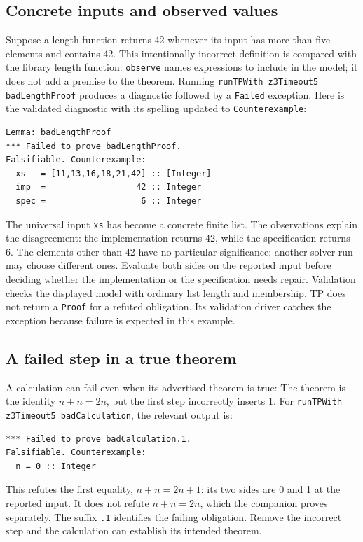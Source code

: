\documentclass[review]{jfp-epi}
\newcommand{\code}[1]{\texttt{#1}}
\begin{document}
\subsection{Concrete inputs and observed values}

Suppose a length function returns 42 whenever its input has more than five
elements and contains 42. This intentionally incorrect definition is compared
with the library length function:
\code{observe} names expressions to include in the model; it does not add a
premise to the theorem. Running \code{runTPWith z3Timeout5 badLengthProof}
produces a diagnostic followed by a \code{Failed} exception. Here is the
validated diagnostic with its spelling updated to \code{Counterexample}:
\begin{lstlisting}[style=output]
Lemma: badLengthProof
*** Failed to prove badLengthProof.
Falsifiable. Counterexample:
  xs   = [11,13,16,18,21,42] :: [Integer]
  imp  =                  42 :: Integer
  spec =                   6 :: Integer
\end{lstlisting}
The universal input \code{xs} has become a concrete finite list. The observations
explain the disagreement: the implementation returns 42, while the specification
returns 6. The elements other than 42 have no particular significance; another
solver run may choose different ones. Evaluate both sides on the reported input
before deciding whether the implementation or the specification needs repair.
Validation checks the displayed model with ordinary list length and membership.
TP does not return a \code{Proof} for a refuted obligation. Its validation driver
catches the exception because failure is expected in this example.

\subsection{A failed step in a true theorem}

A calculation can fail even when its advertised theorem is true:
The theorem is the identity $n+n=2n$, but the first step incorrectly inserts 1.
For \code{runTPWith z3Timeout5 badCalculation}, the relevant output is:
\begin{lstlisting}[style=output]
*** Failed to prove badCalculation.1.
Falsifiable. Counterexample:
  n = 0 :: Integer
\end{lstlisting}
This refutes the first equality, $n+n=2n+1$: its two sides are 0 and 1 at the
reported input. It does not refute $n+n=2n$, which the companion proves separately.
The suffix \code{.1} identifies the failing obligation. Remove the incorrect
step and the calculation can establish its intended theorem.
\end{document}
